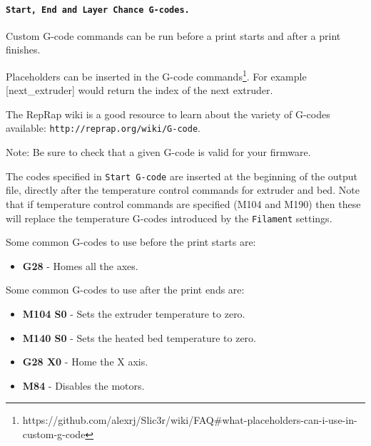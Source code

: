 \paragraph{\texttt{Start, End and Layer Chance G-codes.}} %
\label{par:start_end_g_code}
Custom G-code commands can be run before a print starts and after a print finishes.

Placeholders can be inserted in the G-code commands\footnote{https://github.com/alexrj/Slic3r/wiki/FAQ\#what-placeholders-can-i-use-in-custom-g-code}.  For example [next\_extruder] would return the index of the next extruder.

The RepRap wiki is a good resource to learn about the variety of G-codes available: \texttt{http://reprap.org/wiki/G-code}.

Note: Be sure to check that a given G-code is valid for your firmware.

The codes specified in \texttt{Start G-code} are inserted at the beginning of the output file, directly after the temperature control commands for extruder and bed.  Note that if temperature control commands are specified (M104 and M190) then these will replace the temperature G-codes introduced by the \texttt{Filament} settings.

Some common G-codes to use before the print starts are:
\begin{itemize}
	\item \textbf{G28}  - Homes all the axes.
\end{itemize}


Some common G-codes to use after the print ends are:
\begin{itemize}
	\item \textbf{M104 S0}  - Sets the extruder temperature to zero.
	\item \textbf{M140 S0} - Sets the heated bed temperature to zero.
	\item \textbf{G28 X0} - Home the X axis.
	\item \textbf{M84}  - Disables the motors.
\end{itemize}


